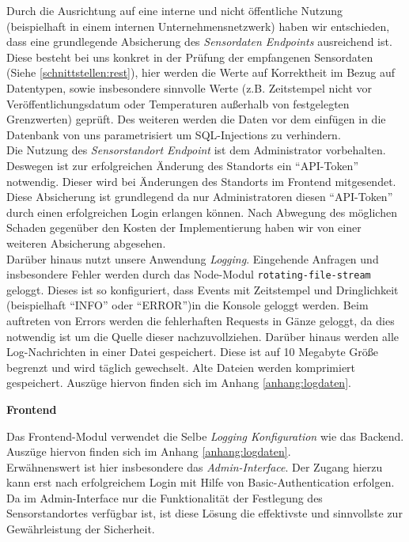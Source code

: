 Durch die Ausrichtung auf eine interne und nicht öffentliche Nutzung (beispielhaft in einem internen Unternehmensnetzwerk) haben wir entschieden, dass eine grundlegende Absicherung des \textit{Sensordaten Endpoints} ausreichend ist.
Diese besteht bei uns konkret in der Prüfung der empfangenen Sensordaten (Siehe \cref{schnittstellen:rest}), hier werden die Werte auf Korrektheit im Bezug auf Datentypen, sowie insbesondere sinnvolle Werte (z.B. Zeitstempel nicht vor Veröffentlichungsdatum oder Temperaturen außerhalb von festgelegten Grenzwerten) geprüft.
Des weiteren werden die Daten vor dem einfügen in die Datenbank von uns parametrisiert um SQL-Injections zu verhindern.\\
Die Nutzung des \textit{Sensorstandort Endpoint} ist dem Administrator vorbehalten.
Deswegen ist zur erfolgreichen Änderung des Standorts ein \enquote{API-Token} notwendig.
Dieser wird bei Änderungen des Standorts im Frontend mitgesendet.
Diese Absicherung ist grundlegend da nur Administratoren diesen \enquote{API-Token} durch einen erfolgreichen Login erlangen können.
Nach Abwegung des möglichen Schaden gegenüber den Kosten der Implementierung haben wir von einer weiteren Absicherung abgesehen.\\
Darüber hinaus nutzt unsere Anwendung \textit{Logging}.
Eingehende Anfragen und insbesondere Fehler werden durch das Node-Modul \texttt{rotating-file-stream} geloggt.
Dieses ist so konfiguriert, dass Events mit Zeitstempel und Dringlichkeit (beispielhaft \enquote{INFO} oder \enquote{ERROR})in die Konsole geloggt werden.
Beim auftreten von Errors werden die fehlerhaften Requests in Gänze geloggt, da dies notwendig ist um die Quelle dieser nachzuvollziehen.
Darüber hinaus werden alle Log-Nachrichten in einer Datei gespeichert.
Diese ist auf 10 Megabyte Größe begrenzt und wird täglich gewechselt.
Alte Dateien werden komprimiert gespeichert.
Auszüge hiervon finden sich im Anhang \ref{anhang:logdaten}.

\textbf{Frontend}

Das Frontend-Modul verwendet die Selbe \textit{Logging Konfiguration} wie das Backend.
Auszüge hiervon finden sich im Anhang \ref{anhang:logdaten}.\\
Erwähnenswert ist hier insbesondere das \textit{Admin-Interface}.
Der Zugang hierzu kann erst nach erfolgreichem Login mit Hilfe von Basic-Authentication erfolgen.
Da im Admin-Interface nur die Funktionalität der Festlegung des Sensorstandortes verfügbar ist, ist diese Lösung die effektivste und sinnvollste zur Gewährleistung der Sicherheit.

